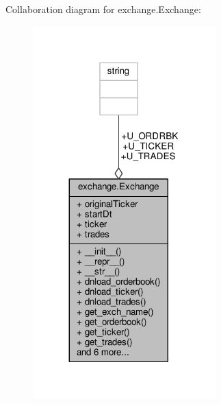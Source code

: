 Collaboration diagram for exchange.\+Exchange\+:
\nopagebreak
\begin{figure}[H]
\begin{center}
\leavevmode
\includegraphics[width=200pt]{classexchange_1_1_exchange__coll__graph}
\end{center}
\end{figure}
